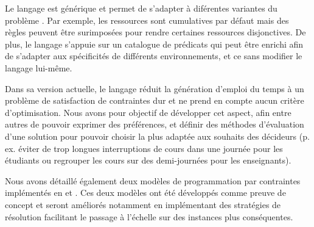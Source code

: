 Le langage est générique et permet de s'adapter à diférentes variantes du problème \UTP{}.
Par exemple, les ressources sont cumulatives par défaut mais des règles peuvent être surimposées pour rendre certaines ressources disjonctives.
De plus, le langage s'appuie sur un catalogue de prédicats qui peut être enrichi afin de s'adapter aux spécificités de différents environnements, et ce sans modifier le langage lui-même.

Dans sa version actuelle, le langage \UTP{} réduit la génération d'emploi du temps à un problème de satisfaction de contraintes dur et ne prend en compte aucun critère d'optimisation.
Nous avons pour objectif de développer cet aspect, afin entre autres de pouvoir exprimer des préférences, et définir des méthodes d'évaluation d'une solution pour pouvoir choisir la plus adaptée aux souhaits des décideurs (p. ex. éviter de trop longues interruptions de cours dans une journée pour les étudiants ou regrouper les cours sur des demi-journées pour les enseignants).

Nous avons détaillé également deux modèles de programmation par contraintes implémentés en \MINIZINC{} et \CHRPP{}.
Ces deux modèles ont été développés comme preuve de concept et seront améliorés notamment en implémentant des stratégies de résolution facilitant le passage à l'échelle sur des instances plus conséquentes.
